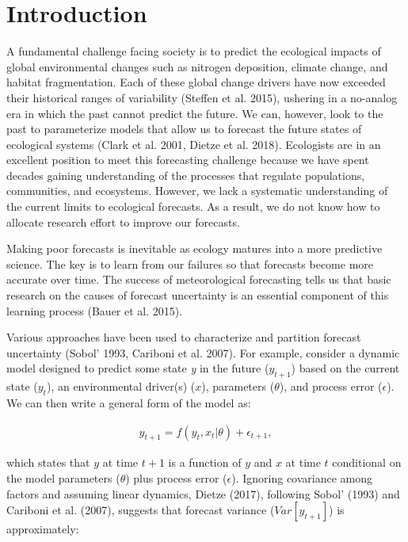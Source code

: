 \documentclass[12pt,]{article}
\begin{document}
\hypertarget{introduction}{%
\section{Introduction}\label{introduction}}

A fundamental challenge facing society is to predict the ecological
impacts of global environmental changes such as nitrogen deposition,
climate change, and habitat fragmentation. Each of these global change
drivers have now exceeded their historical ranges of variability
(Steffen et al. 2015), ushering in a no-analog era in which the past
cannot predict the future. We can, however, look to the past to
parameterize models that allow us to forecast the future states of
ecological systems (Clark et al. 2001, Dietze et al. 2018). Ecologists
are in an excellent position to meet this forecasting challenge because
we have spent decades gaining understanding of the processes that
regulate populations, communities, and ecosystems. However, we lack a
systematic understanding of the current limits to ecological forecasts.
As a result, we do not know how to allocate research effort to improve
our forecasts.

Making poor forecasts is inevitable as ecology matures into a more
predictive science. The key is to learn from our failures so that
forecasts become more accurate over time. The success of meteorological
forecasting tells us that basic research on the causes of forecast
uncertainty is an essential component of this learning process (Bauer et
al. 2015).

Various approaches have been used to characterize and partition forecast
uncertainty (Sobol' 1993, Cariboni et al. 2007). For example, consider a
dynamic model designed to predict some state \emph{y} in the future
(\(y_{t+1}\)) based on the current state (\(y_{t}\)), an environmental
driver(s) (\(x\)), parameters (\(\theta\)), and process error
(\(\epsilon\)). We can then write a general form of the model as:

\begin{align}
y_{t+1} = f(y_t, x_t|\theta) + \epsilon_{t+1},
\end{align}

which states that \(y\) at time \(t+1\) is a function of \(y\) and \(x\)
at time \(t\) conditional on the model parameters (\(\theta\)) plus
process error (\(\epsilon\)). Ignoring covariance among factors and
assuming linear dynamics, Dietze (2017), following Sobol' (1993) and
Cariboni et al. (2007), suggests that forecast variance
(\(Var[y_{t+1}]\)) is approximately:
\end{document}

